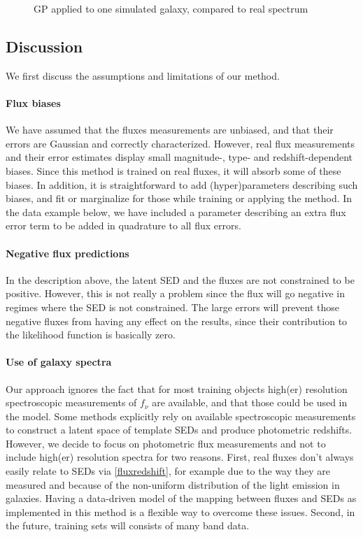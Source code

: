 \documentclass[aps,prd,showpacs,superscriptaddress,groupedaddress]{revtex4}  %
\begin{document}
\begin{figure}
\caption{GP applied to one simulated galaxy, compared to real spectrum}
\label{fig:simgpfluxes}
\end{figure}

\subsection{Discussion}

We first discuss the assumptions and limitations of our method.

\paragraph{Flux biases} 
We have assumed that the fluxes measurements are unbiased, and that their errors are Gaussian and correctly characterized.
However, real flux measurements and their error estimates display small magnitude-, type- and redshift-dependent biases.
Since this method is trained on real fluxes, it will absorb some of these biases. 
In addition, it is straightforward to add (hyper)parameters describing such biases, and fit or marginalize for those while training or applying the method.
In the data example below, we have included a parameter describing an extra flux error term to be added in quadrature to all flux errors.

\paragraph{Negative flux predictions}
In the description above, the latent SED and the fluxes are not constrained to be positive. 
However, this is not really a problem since the flux will go negative in regimes where the SED is not constrained.
The large errors will prevent those negative fluxes from having any effect on the results, since their contribution to the likelihood function is basically zero.

\paragraph{Use of galaxy spectra}
Our approach ignores the fact that for most training objects high(er) resolution spectroscopic measurements of $f_\nu$ are available, and that those could be used in the model. 
Some methods explicitly rely on available spectroscopic measurements to construct a latent space of template SEDs and produce photometric redshifts.
However, we decide to focus on photometric flux measurements and not to include high(er) resolution spectra for two reasons.
First, real fluxes don't always easily relate to SEDs via \eqref{fluxredshift}, for example due to the way they are measured and because of the non-uniform distribution of the light emission in galaxies. 
Having a data-driven model of the mapping between fluxes and SEDs as implemented in this method is a flexible way to overcome these issues.
Second, in the future, training sets will consists of many band data.
\end{document}
